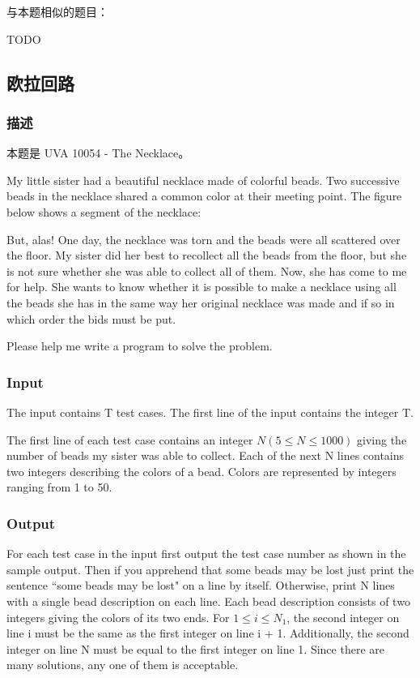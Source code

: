 与本题相似的题目：
\begindot
\item  TODO
\myenddot

\subsection{欧拉回路}

\subsubsection{描述}
本题是 UVA 10054 - The Necklace。

My little sister had a beautiful necklace made of colorful beads. Two successive beads in the 
necklace shared a common color at their meeting point. The figure below shows a segment of 
the necklace:

\centerline{}

But, alas! One day, the necklace was torn and the beads were all scattered over the floor. 
My sister did her best to recollect all the beads from the floor, but she is not sure 
whether she was able to collect all of them. Now, she has come to me for help. She wants
 to know whether it is possible to make a necklace using all the beads she has in the same
 way her original necklace was made and if so in which order the bids must be put.

Please help me write a program to solve the problem.

\subsubsection{Input}
The input contains T test cases. The first line of the input contains the integer T.

The first line of each test case contains an integer $N(5 \leq N \leq 1000)$ giving the number of beads 
my sister was able to collect. Each of the next N lines contains two integers describing 
the colors of a bead. Colors are represented by integers ranging from 1 to 50.

\subsubsection{Output}
For each test case in the input first output the test case number as shown in the sample output. Then 
if you apprehend that some beads may be lost just print the sentence ``some beads may be lost" on a 
line by itself. Otherwise, print N lines with a single bead description on each line. Each bead 
description consists of two integers giving the colors of its two ends. For $1 \leq i \leq N_1$, the second integer 
on line i must be the same as the first integer on line i + 1. Additionally, the second integer 
on line N must be equal to the first integer on line 1. Since there are many solutions, any one
 of them is acceptable.

